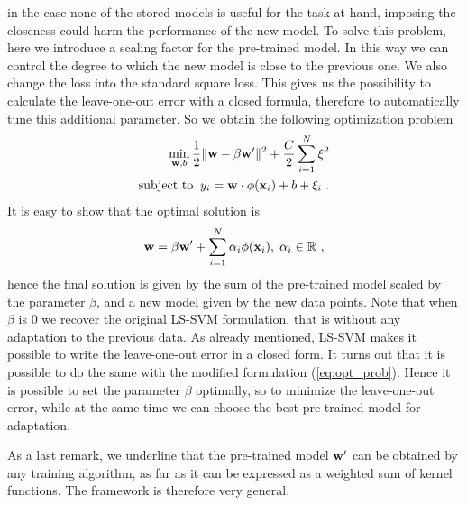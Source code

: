 in the case none of the stored models is useful for the task at hand,
imposing the closeness could harm the performance of the new model.
To solve this problem, here we introduce a scaling factor for
the pre-trained model. In this way we can control the degree to which
the new model is close to the previous one.
We also change the loss into the standard square loss. This
gives us the possibility to calculate the leave-one-out error with a
closed formula, therefore
to automatically tune this additional parameter. So we obtain the
following optimization problem
\begin{align} 
  \min_{\mathbf{w},b} \frac{1}{2} \|\mathbf{w}- \beta \mathbf{w}'\|^2 + \frac{C}{2} \sum_{i=1}^N \xi^2 \nonumber \\
  \mbox{subject to} \;\; y_i = \mathbf{w} \cdot \phi(\mathbf{x}_i) + b + \xi_i~.
  \label{eq:opt_prob}
\end{align}
It is easy to show that the optimal solution is %
\begin{equation}
  \mathbf{w} = \beta \mathbf{w}' + \sum_{i=1}^N \alpha_i \phi(\mathbf{x}_i), \; \alpha_i \in \mathbb{R}~,
\end{equation}
\noindent hence the final solution is given by the sum of the pre-trained model
scaled by the parameter $\beta$, and a new model given by the new data
points.  Note that when $\beta$ is $0$ we recover the original LS-SVM
formulation, that is without any adaptation to the previous data.  As
already mentioned, LS-SVM makes it possible to write the leave-one-out
error in a closed form. It turns out that it is possible to do the
same with the modified formulation (\ref{eq:opt_prob}). Hence it is
possible to set the parameter $\beta$ optimally, so to minimize the
leave-one-out error,
while at the same time we can choose the best pre-trained model for
adaptation.

As a last remark, we underline that the pre-trained model $\mathbf{w}'$ can be
obtained by any training algorithm, as far as it can be expressed as a
weighted sum of kernel functions.  The framework is therefore very
general.
